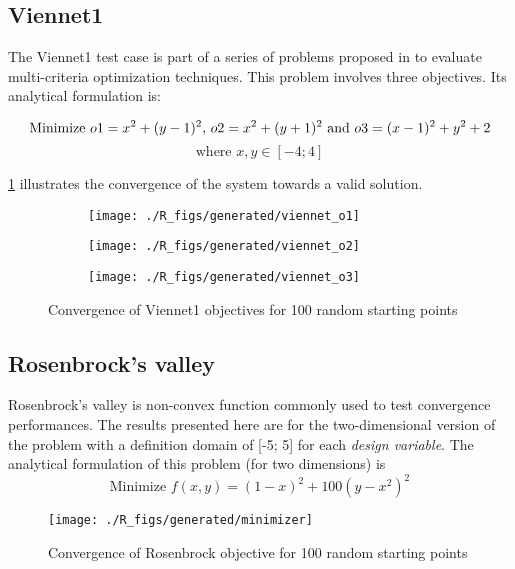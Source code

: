 \subsection{Viennet1}

The Viennet1 test case is part of a series of problems proposed in \cite{viennet1996multicriteria} to evaluate multi-criteria optimization techniques. This problem involves three objectives. Its analytical formulation is:


$$\text{Minimize } o1 = x^2 + (y-1)^2 \text{, } o2 = x^2 + (y+1)^2 \text{ and } o3 = (x-1)^2 + y^2 +2\\$$
$$\text{where } x, y \in  [-4;4]
$$

\figurename \ref{viennet_res} illustrates the convergence of the system towards a valid solution.


\begin{figure}[h]

	\begin{subfigure}[b]{0.32\textwidth}
		\centering
		\texttt{[image: ./R\_figs/generated/viennet\_o1]}	
	\end{subfigure}
	\hfill%
	\begin{subfigure}[b]{0.32\textwidth}
		\centering
		\texttt{[image: ./R\_figs/generated/viennet\_o2]}	
	\end{subfigure}
	\hfill%
	\begin{subfigure}[b]{0.32\textwidth}
		\centering
		\texttt{[image: ./R\_figs/generated/viennet\_o3]}	
	\end{subfigure}
	\caption{Convergence of Viennet1 objectives for 100 random starting points}
	\label{viennet_res}
\end{figure}

\subsection{Rosenbrock's valley}

Rosenbrock's valley is non-convex function commonly used to test convergence performances. The results presented here are for the two-dimensional version of the problem with a definition domain of [-5; 5] for each \emph{design variable}.
The analytical formulation of this problem (for two dimensions) is 
$$\text{Minimize } f(x,y) = (1-x)^2 + 100(y - x^2)^2$$

\begin{wrapfigure}{R}{0.5\textwidth}
    \texttt{[image: ./R\_figs/generated/minimizer]}	
	\caption{Convergence of Rosenbrock objective for 100 random starting points}
	\vspace{-20pt}
\end{wrapfigure}

